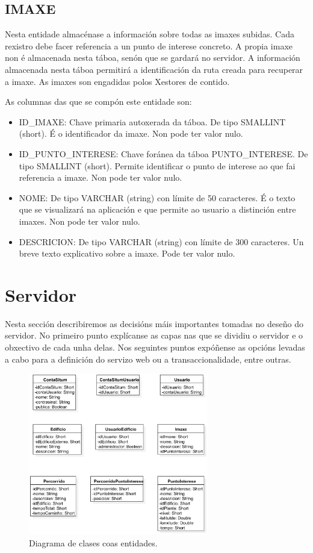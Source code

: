 \subsection{IMAXE}
Nesta entidade almacénase a información sobre todas as imaxes subidas. Cada rexistro debe facer referencia a un punto de interese concreto. A propia imaxe non é almacenada nesta táboa, senón que se gardará no servidor. A información almacenada nesta táboa permitirá a identificación da ruta creada para recuperar a imaxe. As imaxes son engadidas polos Xestores de contido.

As columnas das que se compón este entidade son:
\begin{itemize}
	\item ID\_IMAXE: Chave primaria autoxerada da táboa. De tipo SMALLINT (short). É o identificador da imaxe. Non pode ter valor nulo.
	\item ID\_PUNTO\_INTERESE: Chave foránea da táboa PUNTO\_INTERESE. De tipo SMALLINT (short). Permite identificar o punto de interese ao que fai referencia a imaxe. Non pode ter valor nulo.
	\item NOME: De tipo VARCHAR (string) con límite de 50 caracteres. É o texto que se visualizará na aplicación e que permite ao usuario a distinción entre imaxes. Non pode ter valor nulo.
	\item DESCRICION: De tipo VARCHAR (string) con límite de 300 caracteres. Un breve texto explicativo sobre a imaxe. Pode ter valor nulo.
\end{itemize}


\section{Servidor}
Nesta sección describiremos as decisións máis importantes tomadas no deseño do servidor. No primeiro punto explícanse as capas nas que se dividiu o servidor e o obxectivo de cada unha delas. Nos seguintes puntos expóñense as opcións levadas a cabo para a definición do servizo web ou a transaccionalidade, entre outras.

\begin{figure}[tbh] 
	\begin{center}
		\includegraphics[width=0.70\textwidth]{figures/Clases/diagramaEntidades}
		\caption{Diagrama de clases coas entidades.}
		\label{fig:entidades}
	\end{center}
\end{figure}

